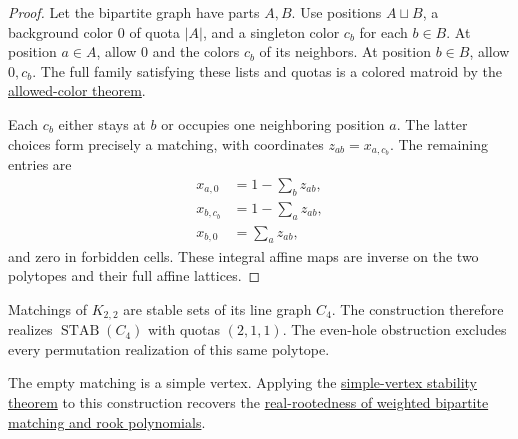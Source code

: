 \begin{proof}
Let the bipartite graph have parts $A,B$. Use positions $A\sqcup B$,
a background color $0$ of quota $|A|$, and a singleton color $c_b$
for each $b\in B$. At position $a\in A$, allow $0$ and the colors
$c_b$ of its neighbors. At position $b\in B$, allow $0,c_b$.
The full family satisfying these lists and quotas is a colored
matroid by the \href{constructions.htm#allowedColors}{allowed-color theorem}.

Each $c_b$ either stays at $b$ or occupies one neighboring position
$a$. The latter choices form precisely a matching, with coordinates
$z_{ab}=x_{a,c_b}$. The remaining entries are
\[
 \begin{aligned}
 x_{a,0}&=1-\sum_bz_{ab},\\
 x_{b,c_b}&=1-\sum_az_{ab},\\
 x_{b,0}&=\sum_az_{ab},
 \end{aligned}
\]
and zero in forbidden cells. These integral affine maps are inverse
on the two polytopes and their full affine lattices.
\end{proof}

Matchings of $K_{2,2}$ are stable sets of its line graph $C_4$.
The construction therefore realizes $\operatorname{STAB}(C_4)$ with
quotas $(2,1,1)$. The even-hole obstruction excludes every permutation
realization of this same polytope.

The empty matching is a simple vertex. Applying the
\href{stability.htm#simpleVertexStability}{simple-vertex stability theorem}
to this construction recovers the
\href{stability.htm#rookPolynomialCorollary}{real-rootedness of weighted
bipartite matching and rook polynomials}.
